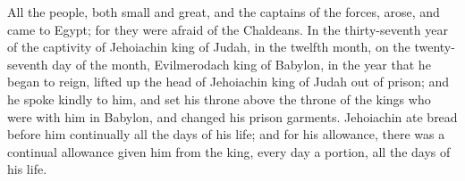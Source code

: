 {All the people, both small and great, and the captains of the forces, arose, and came to Egypt; for they were afraid of the Chaldeans.
In the thirty-seventh year of the captivity of Jehoiachin king of Judah, in the twelfth month, on the twenty-seventh day of the month, Evilmerodach king of Babylon, in the year that he began to reign, lifted up the head of Jehoiachin king of Judah out of prison;
and he spoke kindly to him, and set his throne above the throne of the kings who were with him in Babylon,
and changed his prison garments. Jehoiachin ate bread before him continually all the days of his life;
and for his allowance, there was a continual allowance given him from the king, every day a portion, all the days of his life.
\par }